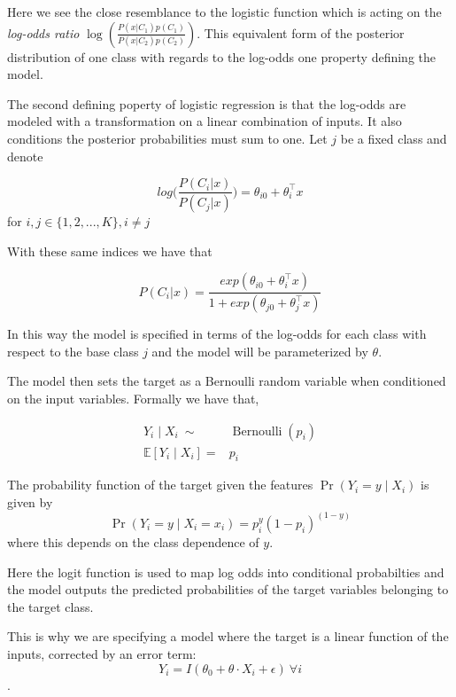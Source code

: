 Here we see the close resemblance to the logistic function which is acting on the \textit{log-odds ratio} $ \log( \frac{ P(x|C_1)p(C_1)}{P(x|C_2)p(C_2) })$. This equivalent form of the posterior distribution of one class with regards to the log-odds one property defining the model.



The second defining poperty of logistic regression is that the log-odds are modeled with a transformation on a linear combination of inputs. It also conditions the posterior probabilities must sum to one. Let $j$ be a fixed class and denote

$$ log\big( \frac{P(C_i|x)}{P(C_j|x)}\big) = \theta_{i0}  + \theta_i^\intercal x  $$\label{logit-logOddss} for $i,j \in \{1,2,...,K\}, i\neq j$

With these same indices we have that

$$ P(C_i|x) = \frac{ exp(\theta_{i0}  + \theta_i^\intercal x)}{1 + exp(\theta_{j0}  + \theta_j^\intercal x)}   $$

In this way the model is specified in terms of the log-odds for each class with respect to the base class $j$ and the model will be parameterized by $\theta$.

The model then sets the target as a Bernoulli random variable when conditioned on the input variables. Formally we have that,

\begin{equation}
\begin{split}
Y_i \mid X_i \  \sim & \operatorname{Bernoulli}(p_i) \\
\mathbb{E}[Y_i \mid X_i ] = & p_i
\end{split}
\end{equation}


The probability function of the target given the features $\Pr(Y_i=y\mid X_i)$ is given by
$$\Pr(Y_i=y \mid X_i = x_i) = p_i^{y} (1-p_i)^{(1-y)}$$\label{logit-probabilityDensity}
where this depends on the class dependence of $y$.

Here the logit function is used to map log odds into conditional probabilties and the model outputs the predicted probabilities of the target variables belonging to the target class.

This is why we are specifying a model where the target is a linear function of the inputs, corrected by an error term:
$$Y_i = I(\theta_0 + \theta \cdot X_i + \epsilon) \ \forall i$$. \label{logit-indicatorFunction}


